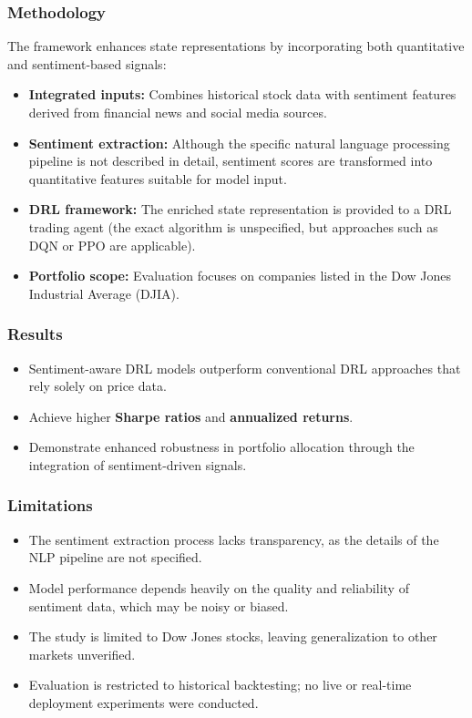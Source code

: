 \documentclass[12pt,a4paper]{report}
\begin{document}
\subsubsection{Methodology}
The framework enhances state representations by incorporating both quantitative and sentiment-based signals:
\begin{itemize}
    \item \textbf{Integrated inputs:} Combines historical stock data with sentiment features derived from financial news and social media sources.  
    \item \textbf{Sentiment extraction:} Although the specific natural language processing pipeline is not described in detail, sentiment scores are transformed into quantitative features suitable for model input.  
    \item \textbf{DRL framework:} The enriched state representation is provided to a DRL trading agent (the exact algorithm is unspecified, but approaches such as DQN or PPO are applicable).  
    \item \textbf{Portfolio scope:} Evaluation focuses on companies listed in the Dow Jones Industrial Average (DJIA).  
\end{itemize}

\subsubsection{Results}
\begin{itemize}
    \item Sentiment-aware DRL models outperform conventional DRL approaches that rely solely on price data.  
    \item Achieve higher \textbf{Sharpe ratios} and \textbf{annualized returns}.  
    \item Demonstrate enhanced robustness in portfolio allocation through the integration of sentiment-driven signals.  
\end{itemize}

\subsubsection{Limitations}
\begin{itemize}
    \item The sentiment extraction process lacks transparency, as the details of the NLP pipeline are not specified.  
    \item Model performance depends heavily on the quality and reliability of sentiment data, which may be noisy or biased.  
    \item The study is limited to Dow Jones stocks, leaving generalization to other markets unverified.  
    \item Evaluation is restricted to historical backtesting; no live or real-time deployment experiments were conducted.  
\end{itemize}
\end{document}
